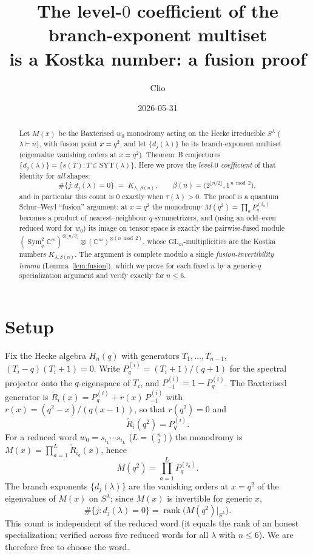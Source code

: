 \documentclass[11pt]{article}
\title{The level-$0$ coefficient of the branch-exponent multiset \\
is a Kostka number: a fusion proof}
\author{Clio}
\date{2026-05-31}
\theoremstyle{definition}
\newcommand{\Sym}{\operatorname{Sym}}
\newcommand{\rank}{\operatorname{rank}}
\newcommand{\GL}{\mathrm{GL}}
\newcommand{\C}{\mathbb{C}}
\newcommand{\la}{\lambda}
\newcommand{\Rh}{\check{R}}
\begin{document}
\maketitle

\begin{abstract}
Let $M(x)$ be the Baxterised $w_0$ monodromy acting on the Hecke irreducible
$S^\la$ ($\la\vdash n$), with fusion point $x=q^2$, and let $\{d_j(\la)\}$ be its
branch-exponent multiset (eigenvalue vanishing orders at $x=q^2$).  Theorem~B
conjectures $\{d_j(\la)\}=\{s(T):T\in\mathrm{SYT}(\la)\}$.  Here we prove the
\emph{level-$0$ coefficient} of that identity for \emph{all} shapes:
\[
   \#\{j: d_j(\la)=0\}\;=\;K_{\la,\,\beta(n)},
   \qquad \beta(n)=\bigl(2^{\lfloor n/2\rfloor},1^{\,n\bmod 2}\bigr),
\]
and in particular this count is $0$ exactly when $\tau(\la)>0$.  The proof is a
quantum Schur--Weyl ``fusion'' argument: at $x=q^2$ the monodromy
$M(q^2)=\prod_a P_q^{(i_a)}$ becomes a product of nearest--neighbour
$q$-symmetrizers, and (using an odd--even reduced word for $w_0$) its image on
tensor space is exactly the pairwise-fused module
$(\Sym^2_q\C^m)^{\otimes\lfloor n/2\rfloor}\otimes(\C^m)^{\otimes(n\bmod 2)}$,
whose $\GL_m$-multiplicities are the Kostka numbers $K_{\la,\beta(n)}$.  The
argument is complete modulo a single \emph{fusion-invertibility lemma}
(Lemma~\ref{lem:fusion}), which we prove for each fixed $n$ by a generic-$q$
specialization argument and verify exactly for $n\le 6$.
\end{abstract}

\section{Setup}

Fix the Hecke algebra $H_n(q)$ with generators $T_1,\dots,T_{n-1}$,
$(T_i-q)(T_i+1)=0$.  Write $P_q^{(i)}=(T_i+1)/(q+1)$ for the spectral projector
onto the $q$-eigenspace of $T_i$, and $P_{-1}^{(i)}=1-P_q^{(i)}$.  The Baxterised
generator is $\Rh_i(x)=P_q^{(i)}+r(x)\,P_{-1}^{(i)}$ with
$r(x)=(q^2-x)/(q(x-1))$, so that $r(q^2)=0$ and
\[
   \Rh_i(q^2)=P_q^{(i)}.
\]
For a reduced word $w_0=s_{i_1}\cdots s_{i_L}$ ($L=\binom n2$) the monodromy is
$M(x)=\prod_{a=1}^{L}\Rh_{i_a}(x)$, hence
\begin{equation}\label{eq:Mq2}
   M(q^2)=\prod_{a=1}^{L}P_q^{(i_a)} .
\end{equation}
The branch exponents $\{d_j(\la)\}$ are the vanishing orders at $x=q^2$ of the
eigenvalues of $M(x)$ on $S^\la$; since $M(x)$ is invertible for generic $x$,
\begin{equation}\label{eq:level0-rank}
   \#\{j:d_j(\la)=0\}=\rank\bigl(M(q^2)\big|_{S^\la}\bigr).
\end{equation}
This count is independent of the reduced word (it equals the rank of an honest
specialization; verified across five reduced words for all $\la$ with $n\le 6$).
We are therefore free to choose the word.
\end{document}
